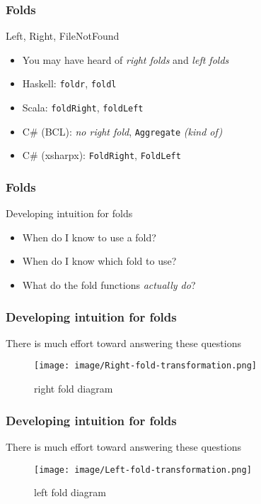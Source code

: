 \begin{frame}
\frametitle{Folds}
\begin{block}{Left, Right, FileNotFound}
\begin{itemize}
\item<1-> You may have heard of \emph{right folds} and \emph{left folds}
\item<2-> Haskell: \lstinline{foldr}, \lstinline{foldl}
\item<2-> Scala: \lstinline{foldRight}, \lstinline{foldLeft}
\item<2-> C\# (BCL): \emph{no right fold}, \lstinline{Aggregate} \emph{(kind of)} 
\item<2-> C\# (xsharpx): \lstinline{FoldRight}, \lstinline{FoldLeft} 
\end{itemize}
\end{block}
\end{frame}

\begin{frame}
\frametitle{Folds}
\begin{block}{Developing intuition for folds}
\begin{itemize}
\item<1-> When do I know to use a fold?
\item<2-> When do I know which fold to use?
\item<3-> What do the fold functions \emph{actually do}?
\end{itemize}
\end{block}
\end{frame}

\begin{frame}
\frametitle{Developing intuition for folds}
\begin{block}{There is much effort toward answering these questions}
\begin{figure}
\centering
\texttt{[image: image/Right-fold-transformation.png]}
\caption{right fold diagram}
\end{figure}
\end{block}
\end{frame}

\begin{frame}
\frametitle{Developing intuition for folds}
\begin{block}{There is much effort toward answering these questions}
\begin{figure}
\centering
\texttt{[image: image/Left-fold-transformation.png]}
\caption{left fold diagram}
\end{figure}
\end{block}
\end{frame}


